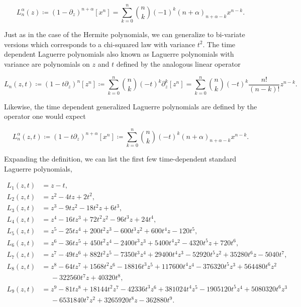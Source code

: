     \begin{equation*}
        L_n^{\alpha}(z) \coloneqq \left( 1 - \partial_z \right)^{n+\alpha}[x^n] = \sum_{k=0}^n \binom nk (-1)^k (n+\alpha)_{n+\alpha-k} x^{n-k}.
    \end{equation*}

    Just as in the case of the Hermite polynomials, we can generalize to bi-variate versions which corresponds to a chi-squared law with variance $t^2$. The time dependent Laguerre polynomials also known as Laguerre polynomials with variance are polynomials on $z$ and $t$ defined by the analogous linear operator

    \begin{equation} \label{eq:laguerre_with_variance}
        L_n(z,t) \coloneqq (1 - t\partial_z)^n [z^n] \coloneqq \sum_{k=0}^n \binom{n}{k} (-t)^k\partial_z^k[z^n] = \sum_{k=0}^n \binom{n}{k} (-t)^k \frac{n!}{(n-k)!} z^{n-k}.
    \end{equation}

    Likewise, the time dependent generalized Laguerre polynomials are defined by the operator one would expect

    \begin{equation*}
        L_n^{\alpha}(z,t) \coloneqq \left( 1 - t\partial_z \right)^{n+\alpha}[x^n] \coloneqq \sum_{k=0}^n \binom nk (-t)^k (n+\alpha)_{n+\alpha-k}x^{n-k}.
    \end{equation*}

    Expanding the definition, we can list the first few time-dependent standard Laguerre polynomials,

    \begin{align*}
        L_1(z,t) &= z - t, \\
        L_2(z,t) &= z^2 - 4tz + 2t^2,\\
        L_3(z,t) &= z^3 - 9tz^2 - 18t^2z + 6t^3, \\
        L_4(z,t) &= z^4 - 16tz^3 + 72t^2z^2 - 96t^3z + 24t^4,\\
        L_5(z,t) &= z^5 - 25tz^4 + 200t^2z^3 - 600t^3z^2 + 600t^4z - 120t^5,\\
        L_6(z,t) &= z^6 - 36tz^5 + 450t^2z^4 - 2400t^3z^3 + 5400t^4z^2 - 4320t^5z + 720t^6, \\
        L_7(z,t) &= z^7 - 49tz^6 + 882t^2z^5 -7350t^3z^4 + 29400t^4z^3 - 52920t^5z^2 + 35280t^6z - 5040t^7,\\
        L_8(z,t) &= z^8 - 64tz^7 + 1568t^2z^6 - 18816t^3z^5 + 117600t^4z^4 - 376320t^5z^3 + 564480t^6z^2\\ &\phantom{=}- 322560t^7z + 40320t^8,\\
        L_9(z,t) &= z^{9}-81tz^{8}+18144t^2z^{7}-42336t^3z^{6}+381024t^4z^{5}-1905120t^5z^{4}+5080320t^6z^{3}\\ 
        &\phantom{=}-6531840t^7z^{2} +3265920t^8z-362880t^9.
    \end{align*}

